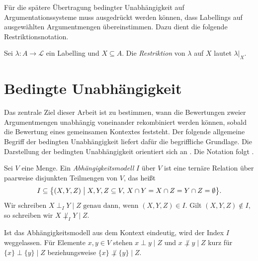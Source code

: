 Für die spätere Übertragung bedingter Unabhängigkeit auf
Argumentationssysteme muss ausgedrückt werden können, dass Labellings auf
ausgewählten Argumentmengen übereinstimmen. Dazu dient die folgende
Restriktionsnotation.
\begin{Definition}
    \label{def:labelling-restriction}
    Sei \(\lambda\colon A\to\mathcal{L}\) ein Labelling und \(X\subseteq A\).
    Die \emph{Restriktion} von \(\lambda\) auf \(X\) lautet
    \(
        \lambda|_X
    \).
\end{Definition}

\section{Bedingte Unabhängigkeit}
\label{sec:conditional-independence}
Das zentrale Ziel dieser Arbeit ist zu bestimmen, wann die Bewertungen
zweier Argumentmengen unabhängig voneinander rekombiniert werden können,
sobald die Bewertung eines gemeinsamen Kontextes feststeht. Der folgende
allgemeine Begriff der bedingten Unabhängigkeit liefert dafür die
begriffliche Grundlage.
Die Darstellung der bedingten Unabhängigkeit orientiert
sich an \textcite{pearl:paz:1986:graphoids}. Die Notation folgt
\textcite{bluemel:2025:independence-aba}.

\begin{Definition}[Abhängigkeitsmodell]
    \label{def:dependency-model}
    Sei \(V\) eine Menge. Ein \emph{Abhängigkeitsmodell} \(I\) über
    \(V\) ist eine ternäre Relation über paarweise disjunkten
    Teilmengen von \(V\), das heißt
    \[
        I \subseteq
        \bigl\{(X,Y,Z) \bigm| X,Y,Z\subseteq V,\,
        X\cap Y=X\cap Z=Y\cap Z=\emptyset\bigr\}.
    \]
    Wir schreiben
    \(
        X\perp_I Y\mid Z \text{ genau dann, wenn }
        (X,Y,Z)\in I.
    \)
    Gilt \((X,Y,Z)\notin I\), so
    schreiben wir \(X\not\perp_I Y\mid Z\).
\end{Definition}
Ist das Abhängigkeitsmodell aus dem Kontext eindeutig,
wird der Index \(I\) weggelassen. Für Elemente \(x,y\in V\) stehen
\(x\perp y\mid Z\) und \(x\not\perp y\mid Z\) kurz für
\(\{x\}\perp\{y\}\mid Z\) beziehungsweise
\(\{x\}\not\perp\{y\}\mid Z\).

